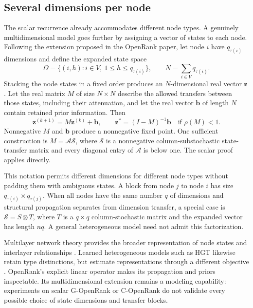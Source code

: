 \subsection{Several dimensions per node}
The scalar recurrence already accommodates different node types. A genuinely multidimensional model goes further by assigning a vector of states to each node. Following the extension proposed in the OpenRank paper, let node \(i\) have \(q_{\tau(i)}\) dimensions and define the expanded state space
\begin{equation}
 \Omega=\{(i,h):i\in V,\ 1\leq h\leq q_{\tau(i)}\},
 \qquad N=\sum_{i\in V}q_{\tau(i)}.
 \label{eq:ch5-state-space}
\end{equation}
Stacking the node states in a fixed order produces an \(N\)-dimensional real vector \(\boldsymbol z\). Let the real matrix \(M\) of size \(N\times N\) describe the allowed transfers between those states, including their attenuation, and let the real vector \(\boldsymbol b\) of length \(N\) contain retained prior information. Then
\begin{equation}
 \boldsymbol z^{(k+1)}=M\boldsymbol z^{(k)}+\boldsymbol b,
 \qquad
 \boldsymbol z^*=(I-M)^{-1}\boldsymbol b
 \quad\text{if }\rho(M)<1.
 \label{eq:ch5-expanded}
\end{equation}
Nonnegative \(M\) and \(\boldsymbol b\) produce a nonnegative fixed point. One sufficient construction is \(M=\mathcal A\mathcal S\), where \(\mathcal S\) is a nonnegative column-substochastic state-transfer matrix and every diagonal entry of \(\mathcal A\) is below one. The scalar proof applies directly.

This notation permits different dimensions for different node types without padding them with ambiguous states. A block from node \(j\) to node \(i\) has size \(q_{\tau(i)}\times q_{\tau(j)}\). When all nodes have the same number \(q\) of dimensions and structural propagation separates from dimension transfer, a special case is \(\mathcal S=S\otimes T\), where \(T\) is a \(q\times q\) column-stochastic matrix and the expanded vector has length \(nq\). A general heterogeneous model need not admit this factorization.

Multilayer network theory provides the broader representation of node states and interlayer relationships \citep{dedomenico2013}. Learned heterogeneous models such as HGT likewise retain type distinctions, but estimate representations through a different objective \citep{hu2020}. OpenRank's explicit linear operator makes its propagation and priors inspectable. Its multidimensional extension remains a modeling capability: experiments on scalar G-OpenRank or C-OpenRank do not validate every possible choice of state dimensions and transfer blocks.

